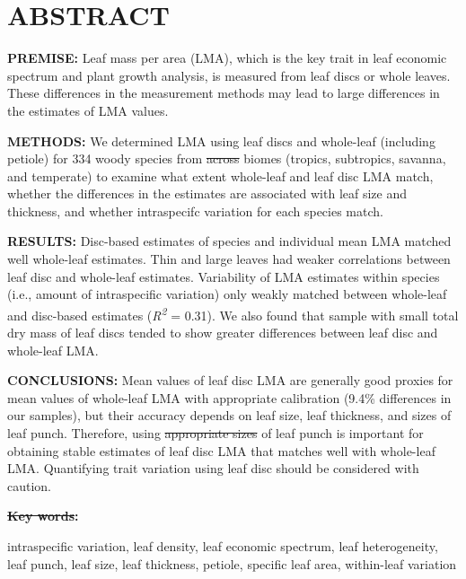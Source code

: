 \documentclass[
  12pt,
  a4paper,
,tablecaptionabove
]{scrartcl}
\providecommand{\DIFaddtex}[1]{{\protect\color{blue}\uwave{#1}}} %
\providecommand{\DIFdeltex}[1]{{\protect\color{red}\sout{#1}}}                      %
\providecommand{\DIFaddbegin}{} %
\providecommand{\DIFaddend}{} %
\providecommand{\DIFdelbegin}{} %
\providecommand{\DIFdelend}{} %
\providecommand{\DIFadd}[1]{\texorpdfstring{\DIFaddtex{#1}}{#1}} %
\providecommand{\DIFdel}[1]{\texorpdfstring{\DIFdeltex{#1}}{}} %
\newcommand{\DIFscaledelfig}{0.5}
\newlength{\DIFdelgraphicswidth} %
\newlength{\DIFdelgraphicsheight} %
\newcommand{\DIFaddincludegraphics}[2][]{{\color{blue}\fbox{\DIFOincludegraphics[#1]{#2}}}} %
\newcommand{\DIFdelincludegraphics}[2][]{%
\sbox{\DIFdelgraphicsbox}{\DIFOincludegraphics[#1]{#2}}%
\settoboxwidth{\DIFdelgraphicswidth}{\DIFdelgraphicsbox} %
\settoboxtotalheight{\DIFdelgraphicsheight}{\DIFdelgraphicsbox} %
\scalebox{\DIFscaledelfig}{%
\parbox[b]{\DIFdelgraphicswidth}{\usebox{\DIFdelgraphicsbox}\\[-\baselineskip] \rule{\DIFdelgraphicswidth}{0em}}\llap{\resizebox{\DIFdelgraphicswidth}{\DIFdelgraphicsheight}{%
\setlength{\unitlength}{\DIFdelgraphicswidth}%
\begin{picture}(1,1)%
\thicklines\linethickness{2pt} %
{\color[rgb]{1,0,0}\put(0,0){\framebox(1,1){}}}%
{\color[rgb]{1,0,0}\put(0,0){\line( 1,1){1}}}%
{\color[rgb]{1,0,0}\put(0,1){\line(1,-1){1}}}%
\end{picture}%
}\hspace*{3pt}}} %
} %
\DeclareRobustCommand{\DIFaddbegin}{\DIFOaddbegin \let\includegraphics\DIFaddincludegraphics} %
\DeclareRobustCommand{\DIFaddend}{\DIFOaddend \let\includegraphics\DIFOincludegraphics} %
\DeclareRobustCommand{\DIFdelbegin}{\DIFOdelbegin \let\includegraphics\DIFdelincludegraphics} %
\DeclareRobustCommand{\DIFdelend}{\DIFOaddend \let\includegraphics\DIFOincludegraphics} %
\begin{document}
\hypertarget{abstract}{%
\section{ABSTRACT}\label{abstract}}

\textbf{PREMISE:} Leaf mass per area (LMA), which is the key trait in
leaf economic spectrum and plant growth analysis, is measured from leaf
discs or whole leaves. These differences in the measurement methods may
lead to large differences in the estimates of LMA values.

\textbf{METHODS:} We determined LMA using leaf discs and whole-leaf
(including petiole) for 334 woody species from \DIFdelbegin \DIFdel{across }\DIFdelend \DIFaddbegin \DIFadd{a wide range of }\DIFaddend biomes
(tropics, subtropics, savanna, and temperate) to examine what extent
whole-leaf and leaf disc LMA match, whether the differences in the
estimates are associated with leaf size and thickness, and whether
intraspecifc variation for each species match.

\textbf{RESULTS:} Disc-based estimates of species and individual mean
LMA matched well whole-leaf estimates. Thin and large leaves had weaker
correlations between leaf disc and whole-leaf estimates. Variability of
LMA estimates within species (i.e., amount of intraspecific variation)
only weakly matched between whole-leaf and disc-based estimates
(\emph{R\textsuperscript{2}} = 0.31). We also found that sample with
small total dry mass of leaf discs tended to show greater differences
between leaf disc and whole-leaf LMA.

\textbf{CONCLUSIONS:} Mean values of leaf disc LMA are generally good
proxies for mean values of whole-leaf LMA with appropriate calibration
(9.4\% differences in our samples), but their accuracy depends on leaf
size, leaf thickness, and sizes of leaf punch. Therefore, using \DIFdelbegin \DIFdel{appropriate sizes }\DIFdelend \DIFaddbegin \DIFadd{an
appropriate size }\DIFaddend of leaf punch is important for obtaining stable
estimates of leaf disc LMA that matches well with whole-leaf LMA.
Quantifying trait variation using leaf disc should be considered with
caution.

\textbf{\DIFdelbegin \DIFdel{Key words}\DIFdelend \DIFaddbegin \DIFadd{KEY WORDS}\DIFaddend :} \DIFdelbegin %

\DIFdelend intraspecific variation, leaf density, leaf economic
spectrum, leaf heterogeneity, leaf punch, leaf size, leaf thickness,
petiole, specific leaf area, within-leaf variation
\end{document}
